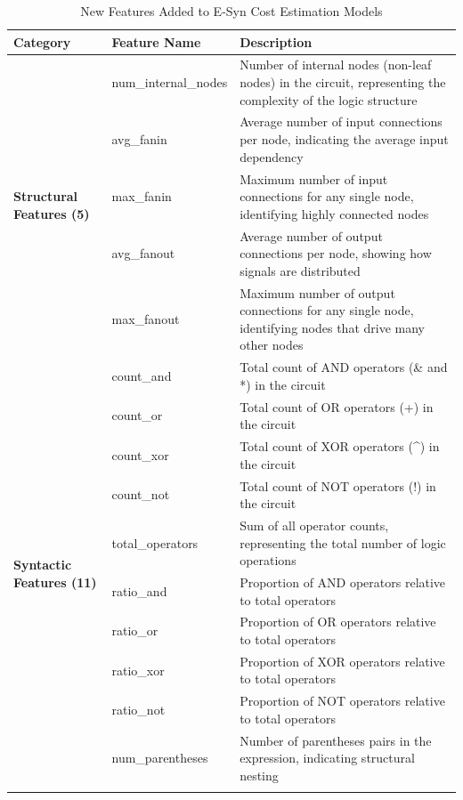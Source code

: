 \documentclass[10pt,twocolumn]{article}
\begin{document}
\begin{table}[t]
\centering
\caption{New Features Added to E-Syn Cost Estimation Models}
\label{tab:new_features}
\small
\begin{tabular}{|l|l|p{9cm}|}
\hline
\textbf{Category} & \textbf{Feature Name} & \textbf{Description} \\
\hline
\multirow{5}{*}{\textbf{Structural Features (5)}} & num\_internal\_nodes & Number of internal nodes (non-leaf nodes) in the circuit, representing the complexity of the logic structure \\
\cline{2-3}
 & avg\_fanin & Average number of input connections per node, indicating the average input dependency \\
\cline{2-3}
 & max\_fanin & Maximum number of input connections for any single node, identifying highly connected nodes \\
\cline{2-3}
 & avg\_fanout & Average number of output connections per node, showing how signals are distributed \\
\cline{2-3}
 & max\_fanout & Maximum number of output connections for any single node, identifying nodes that drive many other nodes \\
\hline
\multirow{11}{*}{\textbf{Syntactic Features (11)}} & count\_and & Total count of AND operators (\& and *) in the circuit \\
\cline{2-3}
 & count\_or & Total count of OR operators (+) in the circuit \\
\cline{2-3}
 & count\_xor & Total count of XOR operators (\textasciicircum) in the circuit \\
\cline{2-3}
 & count\_not & Total count of NOT operators (!) in the circuit \\
\cline{2-3}
 & total\_operators & Sum of all operator counts, representing the total number of logic operations \\
\cline{2-3}
 & ratio\_and & Proportion of AND operators relative to total operators \\
\cline{2-3}
 & ratio\_or & Proportion of OR operators relative to total operators \\
\cline{2-3}
 & ratio\_xor & Proportion of XOR operators relative to total operators \\
\cline{2-3}
 & ratio\_not & Proportion of NOT operators relative to total operators \\
\cline{2-3}
 & num\_parentheses & Number of parentheses pairs in the expression, indicating structural nesting \\
\cline{2-3}

\end{tabular}
\end{table}
\end{document}

